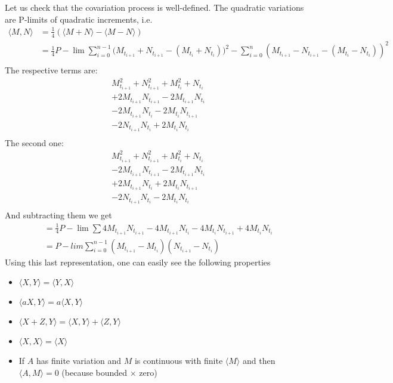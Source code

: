 \documentclass[english]{article}
\begin{document}
Let us check that the covariation process is well-defined. The quadratic variations are P-limits of quadratic increments, i.e.
\begin{align*}\langle M,N \rangle&= \frac 14 ( \langle M+N \rangle - \langle M-N\rangle) \\
&= \frac 14 P-\lim \sum^{n-1}_{i=0}\big(M_{t_{i+1}} + N_{t_{i+1}} - (M_{t_i} + N_{t_i})\big)^2  - \sum^n_{i=0} (M_{t_{i+1}} - N_{t_{i+1}} - (M_{t_i} - N_{t_i}))^2 \\ 
\end{align*}
The respective terms are:
\begin{align*} 
& M^2_{t_{i+1}} + N_{t_{i+1}}^2 + M^2_{t_i} + N_{t_{i}} \\
&+ 2M_{t_{i+1}} N_{t_{i+1}} - 2M_{t_{i+1}}N_{t_{i}}\\
&-2M_{t_{i+1}} N_{t_{i}} - 2M_{t_{i}}N_{t_{i+1}}\\
&-2N_{t_{i+1}} N_{t_{i}} + 2M_{t_{i}}N_{t_{i}}\\
\end{align*}
The second one:
\begin{align*} 
& M^2_{t_{i+1}} + N_{t_{i+1}}^2 + M^2_{t_i} + N_{t_{i}} \\
&- 2M_{t_{i+1}} N_{t_{i+1}} - 2M_{t_{i+1}}N_{t_{i}}\\
& +2M_{t_{i+1}} N_{t_{i}} + 2M_{t_{i}}N_{t_{i+1}}\\
&-2N_{t_{i+1}} N_{t_{i}} - 2M_{t_{i}}N_{t_{i}}\\
\end{align*}
And subtracting them we get
\begin{align*} &= \frac 14 P-\lim \sum 4 M_{t_{i+1}} N_{t_{i+1}} - 4 M_{t_{i+1}} N_{t_{i}} - 4 M_{t_{i}} N_{t_{i+1}}  + 4 M_{t_{i}} N_{t_{i}} \\
& = P-lim \sum^{n-1}_{i=0} (M_{t_{i+1}} - M_{t_i})(N_{t_{i+1}} - N_{t_i}) 
\end{align*}
 Using this last representation, one can easily see the following properties \begin{itemize}
 \item $\langle X,Y \rangle = \langle Y, X \rangle$
 \item $\langle aX, Y \rangle = a \langle X,Y \rangle$
 \item $\langle X+Z , Y \rangle = \langle X, Y \rangle + \langle Z, Y \rangle$
 \item $\langle X, X \rangle = \langle X \rangle$
 \item If $A$ has finite variation and $M$ is continuous with finite $\langle M \rangle$ and then $\langle A, M \rangle = 0$ (because bounded $\times$ zero)
 \end{itemize}
 
\end{document}
